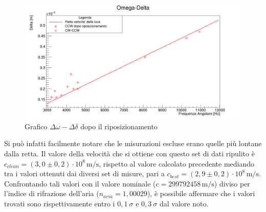 \documentclass{article}
\begin{document}
        \begin{figure}[H]

            \centering
            \includegraphics[scale=0.32]{../images/omega_delta2.png}
            \caption{Grafico $\Delta\omega-\Delta\delta$ dopo il riposizionamento}
            \label{fig:Omega-Delta2}

        \end{figure}

        Si può infatti facilmente notare che le misurazioni escluse erano quelle più lontane dalla retta. 
        Il valore della velocità che si ottiene con questo set di dati ripulito è 
        $c_{clean} = (3,0 \pm 0,2) \cdot 10^8\, \mathrm{m/s}$, rispetto al valore calcolato precedente mediando tra i valori ottenuti dai diversi set di misure, 
        pari a $c_{best} = (2,9 \pm 0,2)\cdot10^8\, \mathrm{m/s.}$
        Confrontando tali valori con il valore nominale ($c = 299 792 458\, \mathrm{m/s}$) diviso per l'indice di rifrazione dell'aria ($n_{aria} = 1,00029$), 
        è possibile affermare che i valori trovati sono rispettivamente entro i $0,1~\sigma$ e $0,3~\sigma$ dal valore noto.
\end{document}
